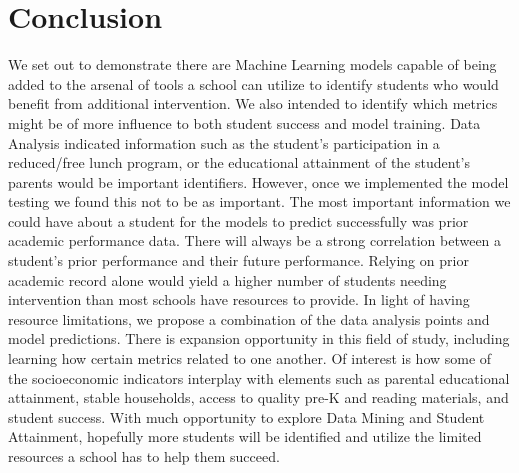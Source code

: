 \documentclass[man,floatsintext]{apa6} %
\begin{document}
\section{Conclusion}
We set out to demonstrate there are Machine Learning models capable of being added to the arsenal of tools a school can utilize to identify students who would benefit from additional intervention. We also intended to identify which metrics might be of more influence to both student success and model training.
Data Analysis indicated information such as the student's participation in a reduced/free lunch program, or the educational attainment of the student's parents would be important identifiers.  However, once we implemented the model testing we found this not to be as important. The most important information we could have about a student for the models to predict successfully was prior academic performance data.
There will always be a strong correlation between a student's prior performance and their future performance. Relying on prior academic record alone would yield a higher number of students needing intervention than most schools have resources to provide. In light of having resource limitations, we propose a combination of the data analysis points and model predictions. There is expansion opportunity in this field of study, including learning how certain metrics related to one another. Of interest is how some of the socioeconomic indicators interplay with elements such as parental educational attainment, stable households, access to quality pre-K and reading materials, and student success. 
With much opportunity to explore Data Mining and Student Attainment, hopefully more students will be identified and utilize the limited resources a school has to help them succeed. 

\end{document}
